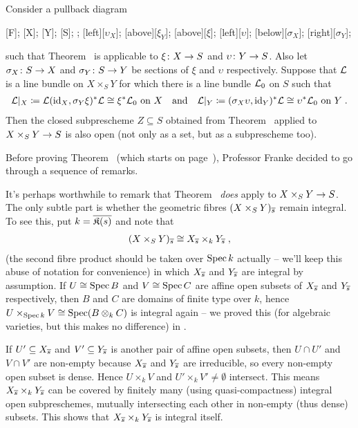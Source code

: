 \documentclass[a4paper,parskip=half,numbers=enddot, DIV=12]{scrreprt}
\begin{document}
\begin{thm}
	Consider a pullback diagram
	\begin{diagram*}
		[F];
		[X];
		[Y];
		[S];
		;
		\scriptsize
		[$\upsilon_X$];
		[above][$\xi_Y$];
		[above][$\xi$];
		[$\upsilon$];
		[below][$\sigma_X$];
		[right][$\sigma_Y$];
	\end{diagram*}
	 such that Theorem~ is applicable to $\xi\colon X\morphism S$ and $\upsilon\colon Y\morphism S$. Also let $\sigma_X\colon S\morphism X$ and $\sigma_Y\colon S\morphism Y$ be sections of $\xi$ and $\upsilon$ respectively. Suppose that $\mathcal{L}$ is a line bundle on $X\times_SY$ for which there is a line bundle $\mathcal{L}_0$ on $S$ such that
	 \begin{align*}
	 	\mathcal{L}|_X\coloneqq\mathcal{L}(\operatorname{id}_X,\sigma_Y\xi)^*\mathcal{L}\cong \xi^*\mathcal{L}_0\text{ on }X\quad\text{and}\quad\mathcal{L}|_Y\coloneqq(\sigma_X\upsilon,\operatorname{id}_Y)^*\mathcal{L}\cong \upsilon^*\mathcal{L}_0\text{ on }Y\;.
	 \end{align*}
	 Then the closed subprescheme $Z\subseteq S$ obtained from Theorem~ applied to $X\times_SY\morphism S$ is also open (not only as a set, but as a subprescheme too).
\end{thm}
Before proving Theorem~ (which starts on page~\pageref{proof:cube}), Professor Franke decided to go through a sequence of remarks.
\begin{rem}
	It's perhaps worthwhile to remark that Theorem~ \emph{does} apply to $X\times_SY\morphism S$. The only subtle part is whether the geometric fibres $(X\times_SY)_{\overline{s}}$ remain integral. To see this, put $k=\overline{\mathfrak{K}(s)}$ and note that
	\begin{align*}
		(X\times_SY)_{\overline{s}}\cong X_{\overline{s}}\times_kY_{\overline{s}}\;,
	\end{align*}
	(the second fibre product should be taken over $\operatorname{Spec} k$ actually -- we'll keep this abuse of notation for convenience) in which $X_{\overline{s}}$ and $Y_{\overline{s}}$ are integral by assumption. If $U\cong \operatorname{Spec} B$ and $V\cong \operatorname{Spec} C$ are affine open subsets of $X_{\overline{s}}$ and $Y_{\overline{s}}$ respectively, then $B$ and $C$ are domains of finite type over $k$, hence $U\times_{\operatorname{Spec} k}V\cong \operatorname{Spec} (B\otimes_kC)$ is integral again -- we proved this (for algebraic varieties, but this makes no difference) in \cite[Proposition~2.2.6]{alg1}.
	
	If $U'\subseteq X_{\overline{s}}$ and $V'\subseteq Y_{\overline{s}}$ is another pair of affine open subsets, then $U\cap U'$ and $V\cap V'$ are non-empty because $X_{\overline{s}}$ and $Y_{\overline{s}}$ are irreducible, so every non-empty open subset is dense. Hence $U\times_kV$ and $U'\times_kV'\neq \emptyset$ intersect. This means $X_{\overline{s}}\times_kY_{\overline{s}}$ can be covered by finitely many (using quasi-compactness) integral open subpreschemes, mutually intersecting each other in non-empty (thus dense) subsets. This shows that $X_{\overline{s}}\times_kY_{\overline{s}}$ is integral itself.
\end{rem}
\end{document}
